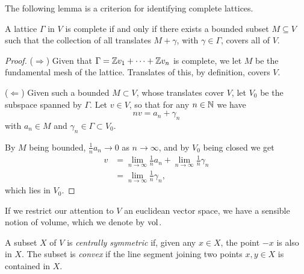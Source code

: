 The following lemma is a criterion for identifying complete lattices.

\begin{lem}[Neukirch 4.3]
	A lattice $\Gamma$ in $V$ is complete if and only if there exists a bounded subset $M\subseteq V$ such that the collection of all translates $M+\gamma$, with $\gamma\in\Gamma$, covers all of $V$.
\end{lem}
\begin{proof}
	($\Longrightarrow$) Given that $\Gamma=\mathbb{Z} v_1 + \cdots + \mathbb{Z} v_n$ is complete, we let $M$ be the fundamental mesh of the lattice. Translates of this, by definition, covers $V$.

	($\Longleftarrow$) Given such a bounded $M\subset V$, whose translates cover $V$, let $V_0$ be the subspace spanned by $\Gamma$. Let $v\in V$, so that for any $n\in\mathbb{N}$ we have
	\[
		nv = a_n + \gamma_n
	\]
	with $a_n\in M$ and $\gamma_n\in\Gamma\subset V_0$.

	By $M$ being bounded, $\frac{1}{n}a_n \to 0$ as $n\to\infty$, and by $V_0$ being closed we get
	\begin{align*}
		v &= \lim_{n\to\infty}\frac{1}{n}a_n + \lim_{n\to\infty}\frac{1}{n}\gamma_n\\
			&= \lim_{n\to\infty} \frac{1}{n}\gamma_n,
	\end{align*}
	which lies in $V_0$.
\end{proof}

If we restrict our attention to $V$ an euclidean vector space, we have a sensible notion of volume, which we denote by $\operatorname{vol}$.

A subset $X$ of $V$ is \emph{centrally symmetric} if, given any $x\in X$, the point $-x$ is also in $X$. The subset is \emph{convex} if the line segment joining two points $x,y\in X$ is contained in $X$.

